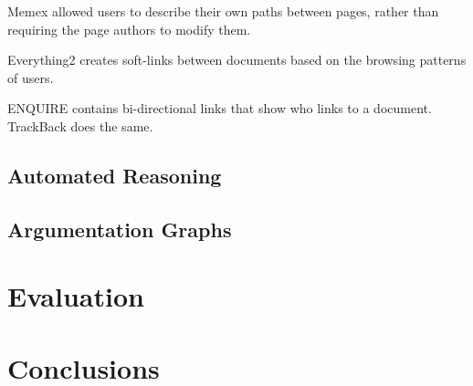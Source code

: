 \documentclass{sig-alternate_nocop}
\begin{document}
Memex allowed users to describe their own paths between pages, rather than requiring the page authors to modify them.

Everything2 creates soft-links between documents based on the browsing patterns of users.

ENQUIRE contains bi-directional links that show who links to a document. TrackBack does the same.

\subsection{Automated Reasoning}

\subsection{Argumentation Graphs}

\section{Evaluation}

\section{Conclusions}
\end{document}
